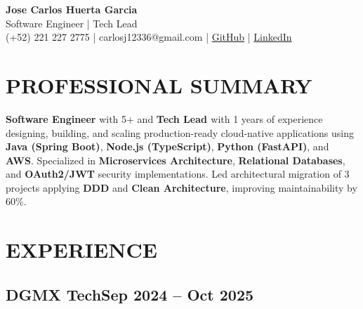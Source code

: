 \documentclass[a4paper,10pt]{article}
\newcommand{\kw}[1]{\textbf{\textcolor{keyword}{#1}}}
\begin{document}
\begin{center}
{\bfseries\LARGE Jose Carlos Huerta Garcia} \\
Software Engineer | Tech Lead \\
(+52) 221 227 2775 | carlosj12336@gmail.com | \href{https://github.com/jcarloshg}{GitHub} | \href{https://www.linkedin.com/in/jose-carlos-huerta-garcia-773952212}{LinkedIn}
\end{center}

\section*{PROFESSIONAL SUMMARY}
\kw{Software Engineer} with 5+ and \kw{Tech Lead } with 1 years of experience designing, building, and scaling production-ready cloud-native applications using \kw{Java (Spring Boot)}, \kw{Node.js (TypeScript)}, \kw{Python (FastAPI)}, and \kw{AWS}. Specialized in \kw{Microservices Architecture}, \kw{Relational Databases}, and \kw{OAuth2/JWT} security implementations. Led architectural migration of 3 projects applying \kw{DDD} and \kw{Clean Architecture}, improving maintainability by 60\%.

\section*{EXPERIENCE}

\subsection*{\small DGMX Tech\hfill\textbf{Sep 2024 -- Oct 2025}}
\end{document}

